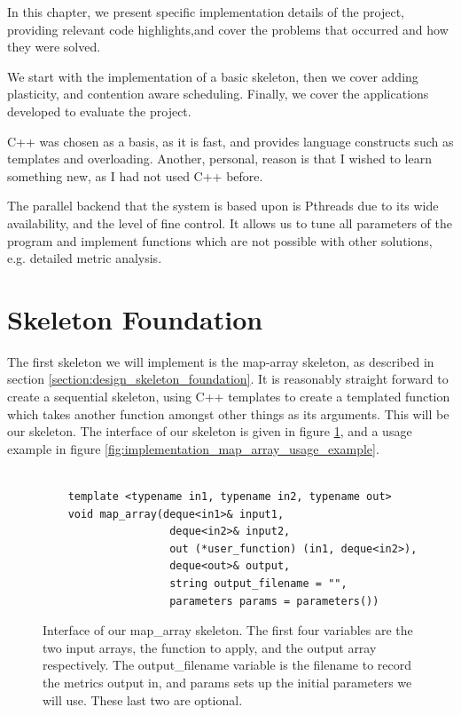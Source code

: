 
In this chapter, we present specific implementation details of the project, providing relevant code highlights,and cover the problems that occurred and how they were solved.

We start with the implementation of a basic skeleton, then we cover adding plasticity, and contention aware scheduling. Finally, we cover the applications developed to evaluate the project.

C++ was chosen as a basis, as it is fast, and provides language constructs such as templates and overloading. Another, personal, reason is that I wished to learn something new, as I had not used C++ before. 

The parallel backend that the system is based upon is Pthreads due to its wide availability, and the level of fine control. It allows us to tune all parameters of the program and implement functions which are not possible with other solutions, e.g. detailed metric analysis. 



\section{Skeleton Foundation}
\label{section:implementation_skeleton_foundation}

The first skeleton we will implement is the map-array skeleton, as described in section \ref{section:design_skeleton_foundation}. It is reasonably straight forward to create a sequential skeleton, using C++ templates to create a templated function which takes another function amongst other things as its arguments. This will be our skeleton. The interface of our skeleton is given in figure \ref{fig:implementation_map_array_interface}, and a usage example in figure \ref{fig:implementation_map_array_usage_example}.



\begin{figure}
	\begin{lstlisting}

	template <typename in1, typename in2, typename out>
	void map_array(deque<in1>& input1, 
				   	deque<in2>& input2, 
				   	out (*user_function) (in1, deque<in2>), 
				   	deque<out>& output, 
				   	string output_filename = "", 
				   	parameters params = parameters())

	\end{lstlisting}

	\caption{Interface of our map\_array skeleton. The first four variables are the two input arrays, the function to apply, and the output array respectively. The output\_filename variable is the filename to record the metrics output in, and params sets up the initial parameters we will use. These last two are optional.}
	\label{fig:implementation_map_array_interface}
\end{figure}



